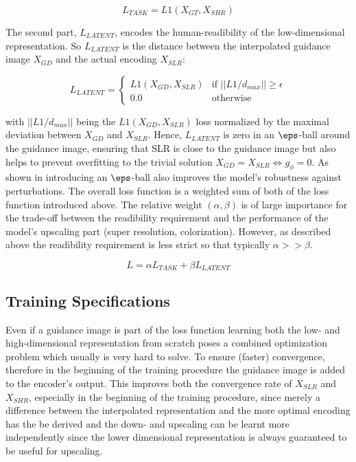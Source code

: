 $$L_{TASK} = L1(X_{GT}, X_{SHR})$$

The second part, $L_{LATENT}$, encodes the human-readibility of the low-dimensional
representation. So $L_{LATENT}$ is the distance between the interpolated guidance
image $X_{GD}$ and the actual encoding $X_{SLR}$:

$$L_{LATENT} = \begin{cases}
L1(X_{GD}, X_{SLR}) & \text{if } ||L1/d_{max}|| \geq \epsilon
\\ 0.0 & \text{otherwise}
\end{cases}$$

with $||L1/d_{max}||$ being the $L1(X_{GD}, X_{SLR})$ loss normalized
by the maximal deviation between $X_{GD}$ and $X_{SLR}$. Hence, $L_{LATENT}$
is zero in an $\eps$-ball around the guidance image, ensuring that \ac{SLR} is
close to the guidance image but also helps to prevent overfitting to the trivial
solution $X_{GD} = X_{SLR} \Leftrightarrow g_\phi = 0$. As shown in
 introducing an $\eps$-ball also improves
the model's robustness against perturbations.
\newline
The overall loss function is a weighted sum of both of the loss function
introduced above. The relative weight $(\alpha, \beta)$ is of large importance
for the trade-off between the readibility requirement and the performance of the
model's upscaling part (super resolution, colorization). However, as described
above the readibility requirement is less strict so that typically
$\alpha >> \beta$.

$$L = \alpha L_{TASK} + \beta L_{LATENT}$$

\subsection{Training Specifications}
\label{sec:Approach_TS}
Even if a guidance image is part of the loss function learning both the low-
and high-dimensional representation from scratch poses a combined optimization
problem which usually is very hard to solve. To ensure (faster) convergence,
therefore in the beginning of the training procedure the guidance image is
added to the encoder's output. This improves both the convergence rate of
$X_{SLR}$ and $X_{SHR}$, especially in the beginning of the training procedure,
since merely a difference between the interpolated representation and the more
optimal encoding has the be derived and the down- and upscaling can be learnt
more independently since the lower dimensional representation is always
guaranteed to be useful for upscaling.

